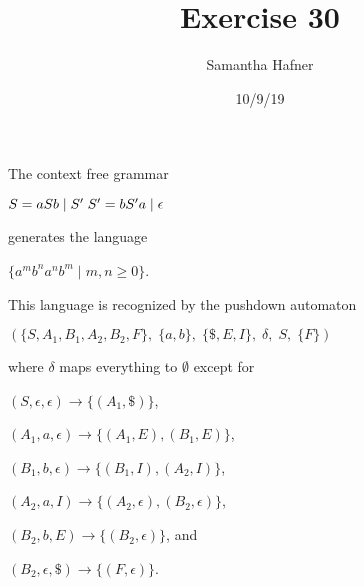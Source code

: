 \documentclass[12pt]{article}
\title{Exercise 30}
\author{Samantha Hafner}
\date{10/9/19}
\begin{document}
\maketitle


The context free grammar
\begin{center}$S = aSb\;\vert\;S'\\\;S' = bS'a\;\vert\;\epsilon$\end{center}

generates the language 

\begin{center}$\{a^m b^n a^n b^m\;|\;m,n\ge0\}$.\end{center}

This language is recognized by the pushdown automaton

\begin{center}$(\{S, A_1, B_1, A_2, B_2, F\},\;\{a, b\},\;\{\$, E, I\},\;\delta,\;S,\;\{F\})$\end{center}

where $\delta$ maps everything to $\emptyset$ except for


\setlength{\parindent}{3em}
$(S,\epsilon,\epsilon) \rightarrow \{(A_1, \$)\}$,

$(A_1,a,\epsilon) \rightarrow \{(A_1, E), (B_1, E)\}$,

$(B_1,b,\epsilon) \rightarrow \{(B_1, I), (A_2, I)\}$,

$(A_2,a,I) \rightarrow \{(A_2, \epsilon), (B_2, \epsilon)\}$,

$(B_2,b,E) \rightarrow \{(B_2, \epsilon)\}$, and

$(B_2,\epsilon,\$) \rightarrow \{(F, \epsilon)\}$.
\end{document}
